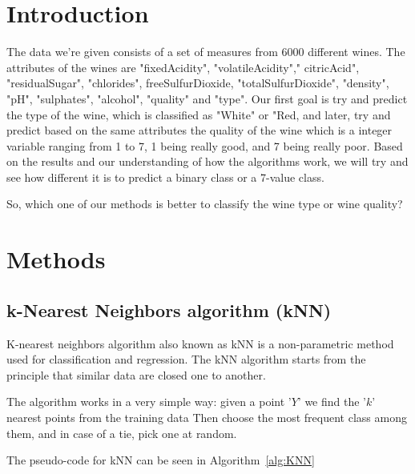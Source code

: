 \documentclass[twoside]{article}
\begin{document}
\begin{multicols}{2} %

\section{Introduction}
\indent \par
The data we're given consists of a set of measures from 6000 different wines. The attributes of the wines are "fixedAcidity", "volatileAcidity"," citricAcid", "residualSugar", "chlorides", freeSulfurDioxide, "totalSulfurDioxide", "density", "pH", "sulphates", "alcohol", "quality" and "type". Our first goal is try and predict the type of the wine, which is classified as "White" or "Red, and later, try and predict based on the same attributes the quality of the wine which is a integer variable ranging from 1 to 7, 1 being really good, and 7 being really poor. Based on the results and our understanding of how the algorithms work, we will try and see how different it is to predict a binary class or a 7-value class.
 \par So, which one of our methods is better to classify the wine type or wine quality?
\\



\section{Methods}
\subsection*{\textbf{k-Nearest Neighbors algorithm (kNN)}}
\indent \par
K-nearest neighbors algorithm also known as kNN is a non-parametric method used for classification and regression. The kNN algorithm starts from the principle that similar data are closed one to another.\par
The algorithm works in a very simple way: given a point '$Y$' we find the '$k$' nearest points from the training data Then choose the most frequent class among them, and in case of a tie, pick one at random.\par
The pseudo-code for kNN can be seen in Algorithm~\ref{alg:KNN} \cite{CA}


\end{multicols}
\end{document}
